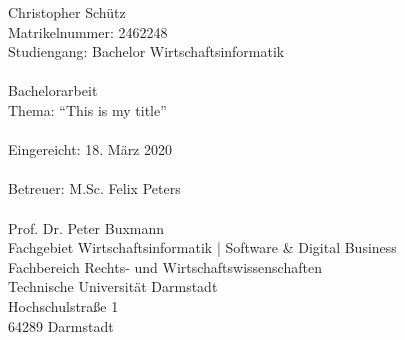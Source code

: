 %
%
%
%
\vspace*{\fill}
\singlespacing 
\noindent Christopher Schütz \\
Matrikelnummer: 2462248 \\
Studiengang: Bachelor Wirtschaftsinformatik \\\\
Bachelorarbeit \\
Thema: ``This is my title'' \\\\
Eingereicht: 18. März 2020 \\\\
Betreuer: M.Sc. Felix Peters \\\\
Prof. Dr. Peter Buxmann \\
Fachgebiet Wirtschaftsinformatik | Software \& Digital Business \\
Fachbereich Rechts- und Wirtschaftswissenschaften \\
Technische Universität Darmstadt \\
Hochschulstraße 1 \\
64289 Darmstadt \\

\onehalfspacing

\setcounter{page}{2}
